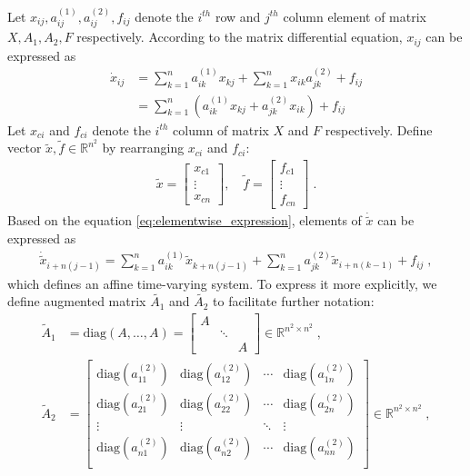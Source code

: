 \documentclass[a4paper,10.5pt]{article}
\newcommand{\R}{\mathbb{R}}
\begin{document}
Let $x_{ij},a^{(1)}_{ij},a^{(2)}_{ij},f_{ij}$ denote the $i^{th}$ row and $j^{th}$ column element of matrix $X,A_1,A_2,F$ respectively. According to the matrix differential equation, $x_{ij}$ can be expressed as
\begin{align}
\label{eq:elementwise_expression}
\dot{x}_{ij} &= \sum_{k=1}^{n} a^{(1)}_{ik}x_{kj} + \sum_{k=1}^{n}x_{ik}a^{(2)}_{jk} + f_{ij} \nonumber \\
&= \sum_{k=1}^{n} \left(a^{(1)}_{ik}x_{kj} + a^{(2)}_{jk}x_{ik}\right) + f_{ij}
\end{align}
Let $x_{ci}$ and $f_{ci}$ denote the $i^{th}$ column of matrix $X$ and $F$ respectively. Define vector $\tilde{x},\tilde{f}\in \R^{n^2}$ by rearranging $x_{ci}$ and $f_{ci}$:
\begin{align*}
\tilde{x} = \begin{bmatrix}x_{c1} \\ \vdots \\ x_{cn}\end{bmatrix}, \quad
\tilde{f} = \begin{bmatrix}f_{c1} \\ \vdots \\ f_{cn}\end{bmatrix} \; .
\end{align*}
Based on the equation \eqref{eq:elementwise_expression}, elements of $\dot{\tilde{x}}$ can be expressed as
\begin{align}
\label{eq:linear_combination}
\dot{\tilde{x}}_{i+n(j-1)} = \sum_{k=1}^{n} a^{(1)}_{ik}\tilde{x}_{k+n(j-1)} + \sum_{k=1}^{n}a^{(2)}_{jk}\tilde{x}_{i+n(k-1)} + f_{ij} \; ,
\end{align}
which defines an affine time-varying system. To express it more explicitly, we define augmented matrix $\tilde{A_1}$ and $\tilde{A_2}$ to facilitate further notation:
\begin{align*}
\tilde{A}_1 &= \text{diag}(A, \dots, A) = \begin{bmatrix}
A &        &   \\
  & \ddots &   \\
  &        & A
\end{bmatrix} \in \R^{n^2 \times n^2} \; , \\
\tilde{A}_2 &= \begin{bmatrix}
\text{diag}(a^{(2)}_{11}) & \text{diag}(a^{(2)}_{12}) & \cdots &\text{diag}(a^{(2)}_{1n}) \\
\text{diag}(a^{(2)}_{21}) & \text{diag}(a^{(2)}_{22}) & \cdots &\text{diag}(a^{(2)}_{2n}) \\
\vdots & \vdots & \ddots & \vdots \\
\text{diag}(a^{(2)}_{n1}) & \text{diag}(a^{(2)}_{n2}) & \cdots &\text{diag}(a^{(2)}_{nn}) \\
\end{bmatrix} \in \R^{n^2 \times n^2} \; ,
\end{align*}
\end{document}
